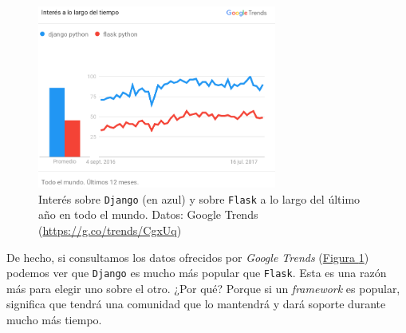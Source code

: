 \begin{figure}
\centering
\includegraphics[width=0.7\textwidth]{img/django_flask_trends}
\caption{Interés sobre \texttt{Django} (en azul) y sobre \texttt{Flask} a lo largo del último año en todo el mundo. Datos: Google Trends (\url{https://g.co/trends/CgxUq})}
\label{djangoflasktrends}
\end{figure}

De hecho, si consultamos los datos ofrecidos por \textit{Google Trends} (\hyperref[djangoflasktrends]{Figura \ref*{djangoflasktrends}}) podemos ver que \texttt{Django} es mucho más popular que \texttt{Flask}. Esta es una razón más para elegir uno sobre el otro. ¿Por qué? Porque si un \textit{framework} es popular, significa que tendrá una comunidad que lo mantendrá y dará soporte durante mucho más tiempo. 

